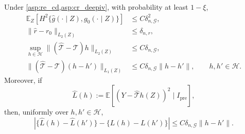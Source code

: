 \begin{lemma}\label{lemma:t_err_dp}
Under \cref{asp:re_cd,asp:cr_deepiv}, with probability at least $1-\xi$,
\begin{align}
\mathbb E_Z\!\left[H^2\{\hat g(\cdot\mid Z),g_0(\cdot\mid Z)\}\right]
&\leqslant C\delta_{n,\mathcal G}^2,
\label{eq:rdiv_mle_hellinger}\\
\|\hat r-r_0\|_{L_2(Z)}&\leqslant \delta_{n,r},\nonumber\\
\sup_{h\in\mathcal H}
\|(\hat{\mathcal T}-\mathcal T)h\|_{L_2(Z)}
&\leqslant C\delta_{n,\mathcal G},\label{eq:rdiv_op_global}\\
\|(\hat{\mathcal T}-\mathcal T)(h-h')\|_{L_1(Z)}
&\leqslant C\delta_{n,\mathcal G}\|h-h'\|,
\qquad h,h'\in\mathcal H.\label{eq:rdiv_op_relative}
\end{align}
Moreover, if
\[
\widehat L(h):=\mathbb E[(Y-\hat{\mathcal T}h(Z))^2\mid I_{\mathrm{pre}}],
\]
then, uniformly over $h,h'\in\mathcal H$,
\begin{equation}\label{eq:rdiv_first_stage_loss}
|\{\widehat L(h)-\widehat L(h')\}-\{L(h)-L(h')\}| \leqslant C\delta_{n,\mathcal G}\|h-h'\|.
\end{equation}


\end{lemma}
